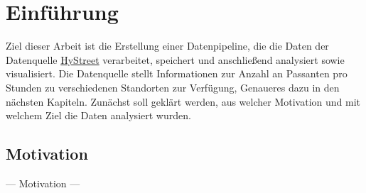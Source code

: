 \section{Einführung}
Ziel dieser Arbeit ist die Erstellung einer Datenpipeline, die die Daten der Datenquelle \href{https://hystreet.com}{HyStreet} verarbeitet, speichert und anschließend analysiert sowie visualisiert. Die Datenquelle stellt Informationen zur Anzahl an Passanten pro Stunden zu verschiedenen Standorten zur Verfügung, Genaueres dazu in den nächsten Kapiteln. Zunächst soll geklärt werden, aus welcher Motivation und mit welchem Ziel die Daten analysiert wurden.

\subsection{Motivation}
--- Motivation ---
    
